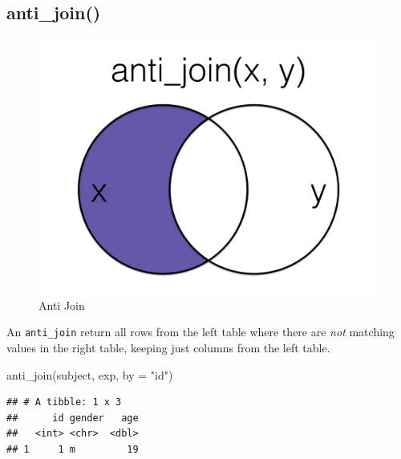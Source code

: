 \documentclass[
  oneside]{book}
\newenvironment{Shaded}{\begin{snugshade}}{\end{snugshade}}
\newcommand{\AttributeTok}[1]{\textcolor[rgb]{0.77,0.63,0.00}{#1}}
\newcommand{\FunctionTok}[1]{\textcolor[rgb]{0.00,0.00,0.00}{#1}}
\newcommand{\NormalTok}[1]{#1}
\newcommand{\StringTok}[1]{\textcolor[rgb]{0.31,0.60,0.02}{#1}}
\begin{document}
\hypertarget{anti_join}{%
\subsection{anti\_join()}\label{anti_join}}

\begin{figure}

{\centering \includegraphics[width=1\linewidth]{images/joins/anti_join} 

}

\caption{Anti Join}\label{fig:img-anti-join}
\end{figure}

An \texttt{anti\_join} return all rows from the left table where there are \emph{not} matching values in the right table, keeping just columns from the left table.

\begin{Shaded}
\begin{Highlighting}[]
\FunctionTok{anti\_join}\NormalTok{(subject, exp, }\AttributeTok{by =} \StringTok{"id"}\NormalTok{)}
\end{Highlighting}
\end{Shaded}

\begin{verbatim}
## # A tibble: 1 x 3
##      id gender   age
##   <int> <chr>  <dbl>
## 1     1 m         19
\end{verbatim}
\end{document}
